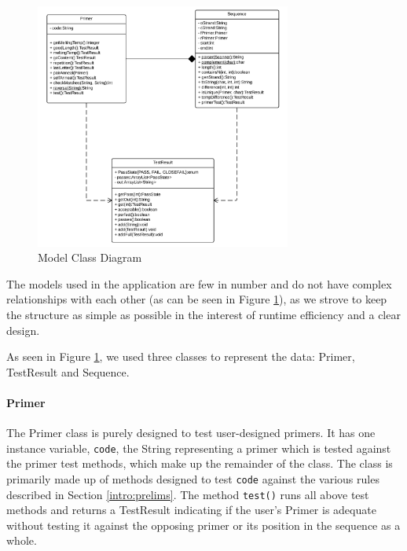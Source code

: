 
\begin{figure}[!t]
  \begin{center}
    \includegraphics[width=0.75\textwidth]{./images/currentBuild/modelClassDiagram.png}
    \caption{
      \label{fig:currentBuild:model}
      Model Class Diagram 
    }
  \end{center}
\end{figure}

The models used in the application are few in number and do not have complex relationships
with each other (as can be seen in Figure \ref{fig:currentBuild:model}), as we strove to 
keep the structure as simple as possible in the interest of runtime efficiency and a clear
design.

As seen in Figure \ref{fig:currentBuild:model}, we used three classes to represent the data:
Primer, TestResult and Sequence.

\paragraph{Primer}
The Primer class is purely designed to test user-designed primers. It has 
one instance variable, \texttt{code}, the String representing a primer
which is tested against the primer test methods, which make up the 
remainder of the class. The class is primarily made up of methods 
designed to test \texttt{code} against the various rules described in Section 
\ref{intro:prelims}. The method \texttt{test()} runs all above test 
methods and returns a TestResult indicating if the user's Primer 
is adequate without testing it against the opposing primer or its position
in the sequence as a whole.


